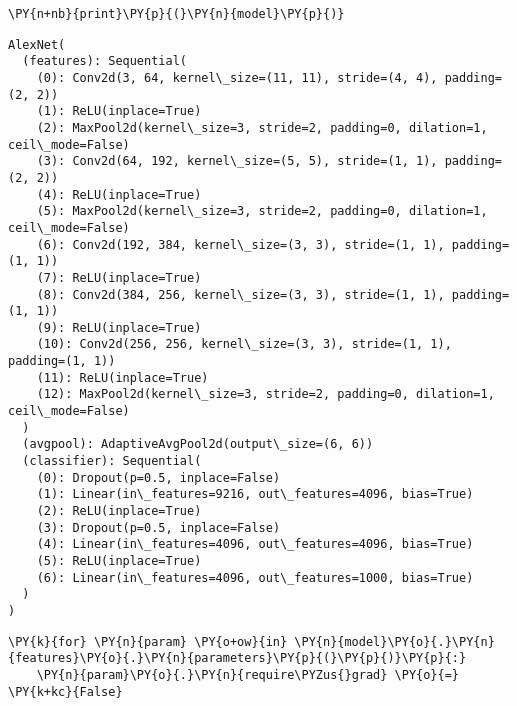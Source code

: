     \begin{tcolorbox}[breakable, size=fbox, boxrule=1pt, pad at break*=1mm,colback=cellbackground, colframe=cellborder]
\begin{Verbatim}[commandchars=\\\{\}]
\PY{n+nb}{print}\PY{p}{(}\PY{n}{model}\PY{p}{)}
\end{Verbatim}
\end{tcolorbox}

    \begin{Verbatim}[commandchars=\\\{\}]
AlexNet(
  (features): Sequential(
    (0): Conv2d(3, 64, kernel\_size=(11, 11), stride=(4, 4), padding=(2, 2))
    (1): ReLU(inplace=True)
    (2): MaxPool2d(kernel\_size=3, stride=2, padding=0, dilation=1,
ceil\_mode=False)
    (3): Conv2d(64, 192, kernel\_size=(5, 5), stride=(1, 1), padding=(2, 2))
    (4): ReLU(inplace=True)
    (5): MaxPool2d(kernel\_size=3, stride=2, padding=0, dilation=1,
ceil\_mode=False)
    (6): Conv2d(192, 384, kernel\_size=(3, 3), stride=(1, 1), padding=(1, 1))
    (7): ReLU(inplace=True)
    (8): Conv2d(384, 256, kernel\_size=(3, 3), stride=(1, 1), padding=(1, 1))
    (9): ReLU(inplace=True)
    (10): Conv2d(256, 256, kernel\_size=(3, 3), stride=(1, 1), padding=(1, 1))
    (11): ReLU(inplace=True)
    (12): MaxPool2d(kernel\_size=3, stride=2, padding=0, dilation=1,
ceil\_mode=False)
  )
  (avgpool): AdaptiveAvgPool2d(output\_size=(6, 6))
  (classifier): Sequential(
    (0): Dropout(p=0.5, inplace=False)
    (1): Linear(in\_features=9216, out\_features=4096, bias=True)
    (2): ReLU(inplace=True)
    (3): Dropout(p=0.5, inplace=False)
    (4): Linear(in\_features=4096, out\_features=4096, bias=True)
    (5): ReLU(inplace=True)
    (6): Linear(in\_features=4096, out\_features=1000, bias=True)
  )
)
    \end{Verbatim}

    \begin{tcolorbox}[breakable, size=fbox, boxrule=1pt, pad at break*=1mm,colback=cellbackground, colframe=cellborder]
\begin{Verbatim}[commandchars=\\\{\}]
\PY{k}{for} \PY{n}{param} \PY{o+ow}{in} \PY{n}{model}\PY{o}{.}\PY{n}{features}\PY{o}{.}\PY{n}{parameters}\PY{p}{(}\PY{p}{)}\PY{p}{:}
    \PY{n}{param}\PY{o}{.}\PY{n}{require\PYZus{}grad} \PY{o}{=} \PY{k+kc}{False}
\end{Verbatim}
\end{tcolorbox}

